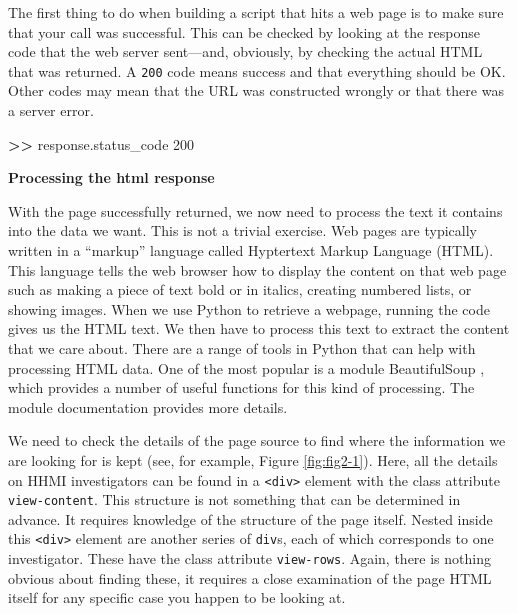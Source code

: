 \documentclass[]{krantz}
\newenvironment{Shaded}{\begin{snugshade}}{\end{snugshade}}
\newcommand{\DecValTok}[1]{\textcolor[rgb]{0.00,0.00,0.81}{#1}}
\newcommand{\StringTok}[1]{\textcolor[rgb]{0.31,0.60,0.02}{#1}}
\newcommand{\OperatorTok}[1]{\textcolor[rgb]{0.81,0.36,0.00}{\textbf{#1}}}
\newcommand{\ErrorTok}[1]{\textcolor[rgb]{0.64,0.00,0.00}{\textbf{#1}}}
\newcommand{\NormalTok}[1]{#1}
\begin{document}
The first thing to do when building a script that hits a web page is to
make sure that your call was successful. This can be checked by looking
at the response code that the web server sent---and, obviously, by
checking the actual HTML that was returned. A \texttt{200} code means
success and that everything should be OK. Other codes may mean that the
URL was constructed wrongly or that there was a server error.

\begin{Shaded}
\begin{Highlighting}[]
\OperatorTok{>}\ErrorTok{>}\StringTok{ }\NormalTok{response.status_code}
\DecValTok{200}
\end{Highlighting}
\end{Shaded}

\textbf{Processing the html response}

With the page successfully returned, we now need to process the text it
contains into the data we want. This is not a trivial exercise. Web
pages are typically written in a ``markup'' language called Hyptertext
Markup Language (HTML). This language tells the web browser how to
display the content on that web page such as making a piece of text bold
or in italics, creating numbered lists, or showing images. When we use
Python to retrieve a webpage, running the code gives us the HTML text.
We then have to process this text to extract the content that we care
about. There are a range of tools in Python that can help with
processing HTML data. One of the most popular is a module BeautifulSoup
\citep{bsoup}, which provides a number of useful functions for this kind
of processing. The module documentation provides more details.

We need to check the details of the page source to find where the
information we are looking for is kept (see, for example, Figure
\ref{fig:fig2-1}). Here, all the details on HHMI investigators can be
found in a \texttt{\textless{}div\textgreater{}} element with the class
attribute \texttt{view-content}. This structure is not something that
can be determined in advance. It requires knowledge of the structure of
the page itself. Nested inside this
\texttt{\textless{}div\textgreater{}} element are another series of
\texttt{div}s, each of which corresponds to one investigator. These have
the class attribute \texttt{view-rows}. Again, there is nothing obvious
about finding these, it requires a close examination of the page HTML
itself for any specific case you happen to be looking at.
\end{document}

